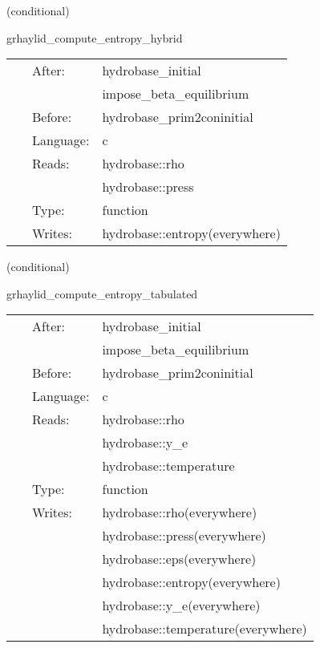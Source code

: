 \documentclass{article}
\begin{document}
\vspace{5mm}

   (conditional) 

\hspace{5mm} grhaylid\_compute\_entropy\_hybrid 

\hspace{5mm}{\it computes entropy from density and pressure using hybrid eos } 


\hspace{5mm}

 \begin{tabular*}{160mm}{cll} 
~ & After:  & hydrobase\_initial \\ 
~& ~ &impose\_beta\_equilibrium\\ 
~ & Before:  & hydrobase\_prim2coninitial \\ 
~ & Language:  & c \\ 
~ & Reads:  & hydrobase::rho \\ 
~& ~ &hydrobase::press\\ 
~ & Type:  & function \\ 
~ & Writes:  & hydrobase::entropy(everywhere) \\ 
\end{tabular*} 


\vspace{5mm}

   (conditional) 

\hspace{5mm} grhaylid\_compute\_entropy\_tabulated 

\hspace{5mm}{\it computes entropy from density, y\_e, and temperature using tabulated eos } 


\hspace{5mm}

 \begin{tabular*}{160mm}{cll} 
~ & After:  & hydrobase\_initial \\ 
~& ~ &impose\_beta\_equilibrium\\ 
~ & Before:  & hydrobase\_prim2coninitial \\ 
~ & Language:  & c \\ 
~ & Reads:  & hydrobase::rho \\ 
~& ~ &hydrobase::y\_e\\ 
~& ~ &hydrobase::temperature\\ 
~ & Type:  & function \\ 
~ & Writes:  & hydrobase::rho(everywhere) \\ 
~& ~ &hydrobase::press(everywhere)\\ 
~& ~ &hydrobase::eps(everywhere)\\ 
~& ~ &hydrobase::entropy(everywhere)\\ 
~& ~ &hydrobase::y\_e(everywhere)\\ 
~& ~ &hydrobase::temperature(everywhere)\\ 
\end{tabular*} 
\end{document}
